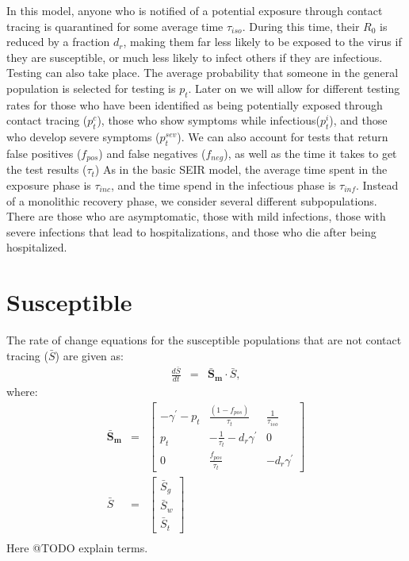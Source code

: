 \documentclass[notitlepage, superscriptaddress]{revtex4-2}
\begin{document}
In this model, anyone who is notified of a potential exposure through contact tracing is quarantined for some average time $\tau_{iso}$. During this time, their $R_{0}$ is reduced by a fraction $d_{r}$, making them far less likely to be exposed to the virus if they are susceptible, or much less likely to infect others if they are infectious. Testing can also take place. The average probability that someone in the general population is selected for testing is $p_{t}$. Later on we will allow for different testing rates for those who have been identified as being potentially exposed through contact tracing ($p^{c}_{t}$), those who show symptoms while infectious($p^{i}_{t}$), and those who develop severe symptoms ($p^{sev}_{t}$). We can also account for tests that return false positives ($f_{pos}$) and false negatives ($f_{neg}$), as well as the time it takes to get the test results ($\tau_{t}$) As in the basic SEIR model, the average time spent in the exposure phase is $\tau_{inc}$, and the time spend in the infectious phase is $\tau_{inf}$. Instead of a monolithic recovery phase, we consider several different subpopulations. There are those who are asymptomatic, those with mild infections, those with severe infections that lead to hospitalizations, and those who die after being hospitalized.

\section{Susceptible}
The rate of change equations for the susceptible populations that are not contact tracing ($\bar{S}$) are given as:
\begin{eqnarray}
\frac{d\bar{S}}{dt} &=& \boldsymbol{\bar{S}_{m}} \cdot  \bar{S}, 
\end{eqnarray}
where:
\begin{eqnarray}
\boldsymbol{\bar{S}_{m}} &=&
\begin{bmatrix}
-\gamma^{'} - p_{t}  &  \frac{(1-f_{pos})}{\tau_{t}}             & \frac{1}{\tau_{iso}} \\ 
 p_{t}              & -\frac{1}{\tau_{t}} - d_{r} \gamma^{'}    & 0  \\ 
 0                  & \frac{f_{pos}}{\tau_{t}}                  &  -d_{r} \gamma^{'}
\end{bmatrix} \\ 
%
\bar{S} &=& 
\begin{bmatrix}
\bar{S}_{g} \\ \bar{S}_{w}\\ \bar{S}_{t}
\end{bmatrix} \\
\end{eqnarray}
Here @TODO explain terms.
\end{document}
